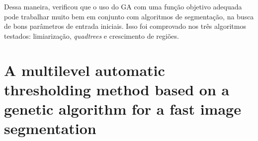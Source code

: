 \documentclass[12pt,oneside,a4paper,english,french,spanish,brazil,]{abntex2}
\begin{document}
Dessa maneira, \citet{matias:2007} verificou que o uso do GA com uma função objetivo adequada pode trabalhar muito bem em conjunto com algoritmos de segmentação, na busca de bons parâmetros de entrada iniciais. Isso foi comprovado nos três algoritmos testados: limiarização, \textit{quadtrees} e crescimento de regiões.

\section{A multilevel automatic thresholding method based on a genetic algorithm for a fast image segmentation}

\end{document}
